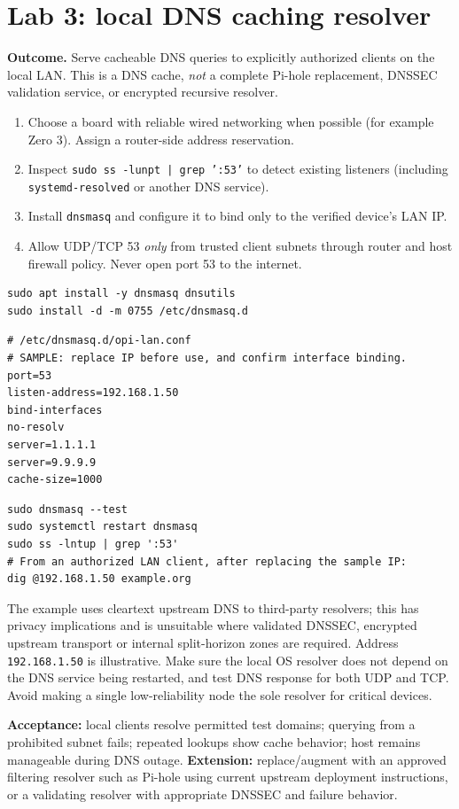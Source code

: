 \documentclass[10pt,oneside,openany]{report}
\newcommand{\tagline}[1]{\noindent{\color{teal}\sffamily\bfseries\small\MakeUppercase{#1}}\par\medskip}
\newcommand{\code}[1]{\texttt{#1}}
\begin{document}
\section{Lab 3: local DNS caching resolver}
\tagline{Difficulty: intermediate \textbullet\ 60--120 minutes}
\textbf{Outcome.} Serve cacheable DNS queries to explicitly authorized clients on the local LAN. This is a DNS cache, \emph{not} a complete Pi-hole replacement, DNSSEC validation service, or encrypted recursive resolver.
\begin{enumerate}
\item Choose a board with reliable wired networking when possible (for example Zero 3). Assign a router-side address reservation.
\item Inspect \code{sudo ss -lunpt | grep ':53'} to detect existing listeners (including \code{systemd-resolved} or another DNS service).
\item Install \code{dnsmasq} and configure it to bind only to the verified device's LAN IP.
\item Allow UDP/TCP 53 \emph{only} from trusted client subnets through router and host firewall policy. Never open port 53 to the internet.
\end{enumerate}
\begin{lstlisting}[style=sh]
sudo apt install -y dnsmasq dnsutils
sudo install -d -m 0755 /etc/dnsmasq.d
\end{lstlisting}
\begin{lstlisting}[style=config]
# /etc/dnsmasq.d/opi-lan.conf
# SAMPLE: replace IP before use, and confirm interface binding.
port=53
listen-address=192.168.1.50
bind-interfaces
no-resolv
server=1.1.1.1
server=9.9.9.9
cache-size=1000
\end{lstlisting}
\begin{lstlisting}[style=sh]
sudo dnsmasq --test
sudo systemctl restart dnsmasq
sudo ss -lntup | grep ':53'
# From an authorized LAN client, after replacing the sample IP:
dig @192.168.1.50 example.org
\end{lstlisting}
\begin{cautionbox}
The example uses cleartext upstream DNS to third-party resolvers; this has privacy implications and is unsuitable where validated DNSSEC, encrypted upstream transport or internal split-horizon zones are required. Address \code{192.168.1.50} is illustrative. Make sure the local OS resolver does not depend on the DNS service being restarted, and test DNS response for both UDP and TCP. Avoid making a single low-reliability node the sole resolver for critical devices.
\end{cautionbox}
\textbf{Acceptance:} local clients resolve permitted test domains; querying from a prohibited subnet fails; repeated lookups show cache behavior; host remains manageable during DNS outage. \textbf{Extension:} replace/augment with an approved filtering resolver such as Pi-hole using current upstream deployment instructions, or a validating resolver with appropriate DNSSEC and failure behavior.
\end{document}
